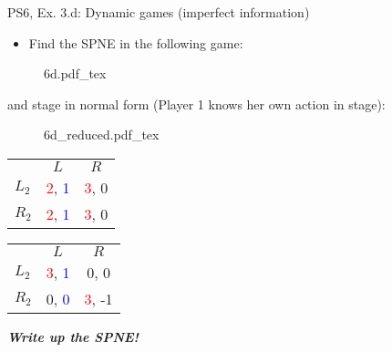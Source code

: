 \begin{frame}{PS6, Ex. 3.d: Dynamic games (imperfect information)}
    \begin{itemize}
      \item[(d)] Find the SPNE in the following game:
    \end{itemize}
    \vspace{-4pt}
    \begin{figure}[!h]
      \center
      \def\svgwidth{.8\columnwidth}
      {6d.pdf_tex}
    \end{figure}
    \vspace{-4pt}
     and  stage in normal form (Player 1 knows her own action in  stage):
    \vspace{-4pt}
    \begin{figure}[!h]
      \center
      \def\svgwidth{.25\columnwidth}
      {6d_reduced.pdf_tex}
    \end{figure}
    \vspace{-9pt}
    \begin{table}
      \begin{tabular}{l|c|c|}
        \multicolumn{1}{c}{} & \multicolumn{1}{c}{\color{blue}$L$} & \multicolumn{1}{c}{$R$} \\\cline{2-3}
        $L_2$ & \textcolor{red}{2}, \textcolor{blue}{1} & \textcolor{red}{3}, 0 \\\cline{2-3}
        $R_2$ & \textcolor{red}{2}, \textcolor{blue}{1} & \textcolor{red}{3}, 0 \\\cline{2-3}
      \end{tabular}
      \enskip
      \begin{tabular}{l|c|c|}
        \multicolumn{1}{c}{} & \multicolumn{1}{c}{\color{blue}$L$} & \multicolumn{1}{c}{$R$} \\\cline{2-3}
        $L_2$ & \textcolor{red}{3}, \textcolor{blue}{1} & 0, 0 \\\cline{2-3}
        $R_2$ & 0, \textcolor{blue}{0} & \textcolor{red}{3}, -1 \\\cline{2-3}
      \end{tabular}
    \end{table}
    \vspace{-4pt}
    \textbf{\textit{Write up the SPNE!}}
    \vfill\null
\end{frame}
